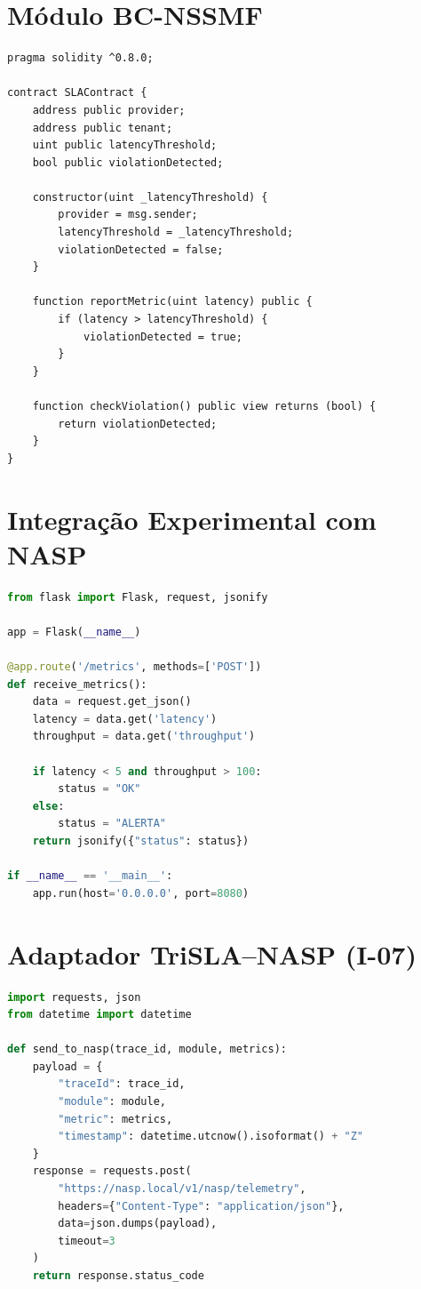 \section{Módulo BC-NSSMF}
\begin{lstlisting}[language=Solidity, caption={Contrato inteligente de verificação de latência.}, label={lst:bc_nssmf_contract}]
pragma solidity ^0.8.0;

contract SLAContract {
    address public provider;
    address public tenant;
    uint public latencyThreshold;
    bool public violationDetected;

    constructor(uint _latencyThreshold) {
        provider = msg.sender;
        latencyThreshold = _latencyThreshold;
        violationDetected = false;
    }

    function reportMetric(uint latency) public {
        if (latency > latencyThreshold) {
            violationDetected = true;
        }
    }

    function checkViolation() public view returns (bool) {
        return violationDetected;
    }
}
\end{lstlisting}

\section{Integração Experimental com NASP}
\begin{lstlisting}[language=Python, caption={Exemplo de integração entre TriSLA e NASP via REST API.}, label={lst:nasp_integration}]
from flask import Flask, request, jsonify

app = Flask(__name__)

@app.route('/metrics', methods=['POST'])
def receive_metrics():
    data = request.get_json()
    latency = data.get('latency')
    throughput = data.get('throughput')

    if latency < 5 and throughput > 100:
        status = "OK"
    else:
        status = "ALERTA"
    return jsonify({"status": status})

if __name__ == '__main__':
    app.run(host='0.0.0.0', port=8080)
\end{lstlisting}

\section{Adaptador TriSLA–NASP (I-07)}
\begin{lstlisting}[language=Python, caption={Adaptador TriSLA–NASP para registro de telemetria via REST (I-07).}, label={lst:trisla_nasp_adapter}]
import requests, json
from datetime import datetime

def send_to_nasp(trace_id, module, metrics):
    payload = {
        "traceId": trace_id,
        "module": module,
        "metric": metrics,
        "timestamp": datetime.utcnow().isoformat() + "Z"
    }
    response = requests.post(
        "https://nasp.local/v1/nasp/telemetry",
        headers={"Content-Type": "application/json"},
        data=json.dumps(payload),
        timeout=3
    )
    return response.status_code
\end{lstlisting}

